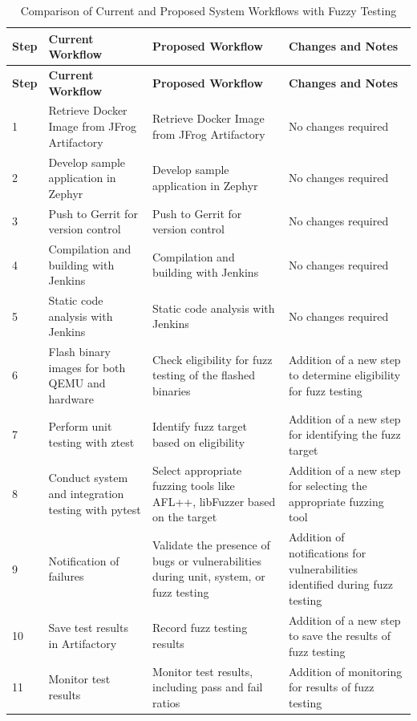 \begin{longtable}{p{1cm}p{3.7cm}p{3.7cm}p{3.7cm}}
\caption{Comparison of Current and Proposed System Workflows with Fuzzy Testing}
\label{tab:system_workflows_comparison_fuzzy} \\
\toprule
\textbf{Step} & \textbf{Current Workflow} & \textbf{Proposed Workflow} & \textbf{Changes and Notes} \\
\midrule
\endfirsthead

\toprule
\textbf{Step} & \textbf{Current Workflow} & \textbf{Proposed Workflow} & \textbf{Changes and Notes} \\
\midrule
\endhead

1 & Retrieve Docker Image from JFrog Artifactory & Retrieve Docker Image from JFrog Artifactory & No changes required \\
\midrule
2 & Develop sample application in Zephyr & Develop sample application in Zephyr & No changes required \\
\midrule
3 & Push to Gerrit for version control & Push to Gerrit for version control & No changes required \\
\midrule
4 & Compilation and building with Jenkins & Compilation and building with Jenkins & No changes required \\
\midrule
5 & Static code analysis with Jenkins & Static code analysis with Jenkins & No changes required \\
\midrule
6 & Flash binary images for both QEMU and hardware & Check eligibility for fuzz testing of the flashed binaries & Addition of a new step to determine eligibility for fuzz testing \\
\midrule
7 & Perform unit testing with ztest & Identify fuzz target based on eligibility & Addition of a new step for identifying the fuzz target \\
\midrule
8 & Conduct system and integration testing with pytest & Select appropriate fuzzing tools like AFL++, libFuzzer based on the target & Addition of a new step for selecting the appropriate fuzzing tool \\
\midrule
9 & Notification of failures & Validate the presence of bugs or vulnerabilities during unit, system, or fuzz testing & Addition of notifications for vulnerabilities identified during fuzz testing \\
\midrule
10 & Save test results in Artifactory & Record fuzz testing results & Addition of a new step to save the results of fuzz testing \\
\midrule
11 & Monitor test results & Monitor test results, including pass and fail ratios & Addition of monitoring for results of fuzz testing \\
\bottomrule
\end{longtable}


